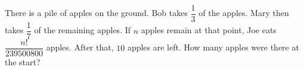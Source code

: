 There is a pile of apples on the ground. Bob takes $\dfrac13$ of the apples. Mary then takes $\dfrac17$ of the remaining apples. If $n$ apples remain at that point, Joe eats $\dfrac{n!}{239500800}$ apples. After that, $10$ apples are left. How many apples were there at the start?
